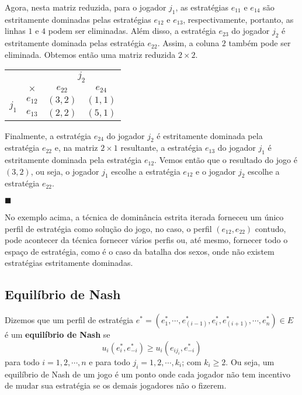 \begin{ex}
Agora, nesta matriz reduzida, para o jogador $j_1$, as estratégias $e_{11}$ e $e_{14}$ são estritamente dominadas pelas estratégias $e_{12}$ e $e_{13}$, respectivamente, portanto, as linhas $1$ e $4$ podem ser eliminadas. Além disso, a estratégia $e_{23}$ do jogador $j_2$ é estritamente dominada pelas estratégia $e_{22}$. Assim, a coluna $2$ também pode ser eliminada. Obtemos então uma matriz reduzida $2 \times 2$.

\begin{center}
\begin{tabular}[H]{c|c|c|c|}
\multicolumn{2}{c}{} & \multicolumn{2}{c}{$j_2$} \\\cline{2-4}
& $\times$ & $e_{22}$ & $e_{24}$\\\cline{2-4}
\multirow{2}{*}{$j_1$} & $e_{12}$ & $(3,2)$ & $(1,1)$ \\\cline{2-4}
& $e_{13}$ & $(2,2)$ & $(5,1)$ \\\cline{2-4}
\end{tabular}
\end{center}\vspace{1cm}

Finalmente, a estratégia $e_{24}$ do jogador $j_2$ é estritamente dominada pela estratégia $e_{22}$ e, na matriz $2 \times 1$ resultante, a estratégia $e_{13}$ do jogador $j_1$ é estritamente dominada pela estratégia $e_{12}$. Vemos então que o resultado do jogo é $(3, 2)$, ou seja, o jogador $j_1$ escolhe a estratégia $e_{12}$ e o jogador $j_2$ escolhe a estratégia $e_{22}$. 

\hfill$\blacksquare$

\end{ex}

No exemplo acima, a técnica de dominância estrita iterada forneceu um único perfil de estratégia como solução do jogo, no caso, o perfil $\left(e_{12},e_{22}\right)$ contudo, pode acontecer da técnica fornecer vários perfis ou, até mesmo, fornecer todo o espaço de estratégia, como é o caso da batalha dos sexos, onde não existem estratégias estritamente dominadas.

\subsection{Equilíbrio de Nash}

Dizemos que um perfil de estratégia $e^*=\left(e^*_{1},\cdots,e^*_{(i-1)},e^*_{i},e^*_{(i+1)},\cdots,e^*_{n}\right)\in E$ é um \textbf{equilíbrio de Nash} se $$u_i\left(e^*_{i},e^*_{-i}\right)\geq u_i\left(e_{ij_i},e^*_{-i}\right)$$ para todo $i=1,2,\cdots,n$ e para todo $j_i=1,2,\cdots,k_i$; com $k_i\geq2$. Ou seja, um equilíbrio de Nash de um jogo é um ponto onde cada jogador não tem incentivo de mudar sua estratégia se os demais jogadores não o fizerem.

